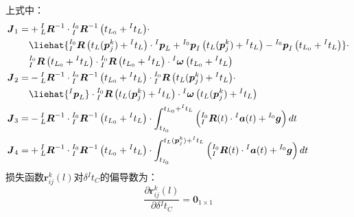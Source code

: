 上式中：
\begin{equation}
  \begin{aligned}
    \boldsymbol{J}_1= & +{{^{I}_{L}}\boldsymbol{R}^{-1}}\cdot{{^{I_0}_{I}}\boldsymbol{R}^{-1}\left( t_{L_0}+{^{I}t_L}\right) }\cdot\\&\liehat{ {{^{I_0}_{I}}\boldsymbol{R}\left( t_{L}(\boldsymbol{p}_j^k)+{^{I}t_L}\right)}
    \cdot{^{I}\boldsymbol{p}_L}+{^{I_0}\boldsymbol{p}_I\left( t_{L}(\boldsymbol{p}_j^k)+{^{I}t_L}\right)}-{^{I_0}\boldsymbol{p}_I\left( t_{L_0}+{^{I}t_L}\right)} }
     \cdot\\&{{^{I_0}_{I}}\boldsymbol{R}\left( t_{L_0}+{^{I}t_L}\right) }\cdot{{^{I_0}_{I}}\boldsymbol{R}\left( t_{L_0}+{^{I}t_L}\right) }
    \cdot{^{I}\boldsymbol{\omega}}\left( t_{L_0}+{^{I}t_L}\right)
    \\
    \boldsymbol{J}_2= & -
    {{^{I}_{L}}\boldsymbol{R}^{-1}}\cdot{{^{I_0}_{I}}\boldsymbol{R}^{-1}\left( t_{L_0}+{^{I}t_L}\right) }\cdot{{^{I_0}_{I}}\boldsymbol{R}\left( t_{L}(\boldsymbol{p}_j^k)+{^{I}t_L}\right) }
    \cdot\\&\liehat{{^{I}\boldsymbol{p}_L}}
    \cdot{{^{I_0}_{I}}\boldsymbol{R}\left( t_{L}(\boldsymbol{p}_j^k)+{^{I}t_L}\right) }
    \cdot{^{I}\boldsymbol{\omega}}\left( t_{L}(\boldsymbol{p}_j^k)+{^{I}t_L}\right)
    \\
    \boldsymbol{J}_3= & -{{^{I}_{L}}\boldsymbol{R}^{-1}}
    \cdot{{^{I_0}_{I}}\boldsymbol{R}^{-1}\left( t_{L_0}+{^{I}t_L}\right) }
    \cdot
    \int_{t_{I_0}}^{t_{L_0}+{^{I}t_L}}\left( {^{I_0}_{I}\boldsymbol{R}}(t)\cdot{^{I}\boldsymbol{a}}(t)+{^{I_0}\boldsymbol{g}}\right)dt
    \\
    \boldsymbol{J}_4= & +
    {{^{I}_{L}}\boldsymbol{R}^{-1}}\cdot{{^{I_0}_{I}}\boldsymbol{R}^{-1}\left( t_{L_0}+{^{I}t_L}\right) }
    \cdot
    \int_{t_{I_0}}^{t_{L}(\boldsymbol{p}_j^k)+{^{I}t_L}}\left( {^{I_0}_{I}\boldsymbol{R}}(t)\cdot{^{I}\boldsymbol{a}}(t)+{^{I_0}\boldsymbol{g}}\right)dt
  \end{aligned}
\end{equation}
损失函数$\boldsymbol{r}_{ij}^k(l)$对$\delta{^{I}t_{C}}$的偏导数为：
\begin{equation}
  \frac{\partial \boldsymbol{r}_{ij}^k(l)}{\partial \delta {^{I}t_{C}}}=\boldsymbol{0}_{1\times 1}
\end{equation}

